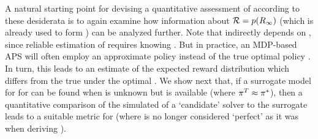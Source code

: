     
 A natural starting point for devising a quantitative assessment of \xQ{} according to these desiderata is to again examine how information about $\mathcal{R}=p(R_{\infty})$ (which is already used to form \xO{}) can be analyzed further. 
 Note that \xO{} indirectly depends on \xQ{}, since reliable estimation of \rwd{} requires knowing \piopt. But in practice, an MDP-based APS will often employ an approximate policy \piapprox{} instead of the true optimal policy \piopt. In turn, this leads to an estimate \ppiapproxri{} of the expected reward distribution which differs from the true \ppioptri{} under the optimal \piopt. We show next that, if a surrogate model for \rwdpredicted{} for \rwdtrust{} can be found when \piopt{} is unknown but \pitrust{} is available (where $\pi^T \approx \pi^*$), then a quantitative comparison of the simulated \rwdcandsim{} of a `candidate' solver to the surrogate \rwdpredicted{} leads to a suitable metric for \xQ{} (where \xQ{} is no longer considered `perfect' as it was when deriving \xO). 
    
    
